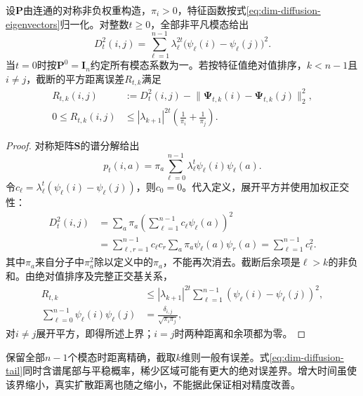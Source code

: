 \begin{theorem}[扩散距离的谱表示与截断界]
  \label{thm:dim-diffusion-isometry}
  设$\bm{P}$由连通的对称非负权重构造，$\pi_i>0$，特征函数按式\eqref{eq:dim-diffusion-eigenvectors}归一化。对整数$t\geq0$，全部非平凡模态给出
  \begin{equation}
    \label{eq:dim-diffusion-identity}
    D_t^2(i,j)
    =\sum_{\ell=1}^{n-1}\lambda_\ell^{2t}
      \bigl(\psi_\ell(i)-\psi_\ell(j)\bigr)^2.
  \end{equation}
  当$t=0$时按$\bm{P}^0=\bm{I}_n$约定所有模态系数为一。若按特征值绝对值排序，$k<n-1$且$i\ne j$，截断的平方距离误差$R_{t,k}$满足
  \begin{equation}
    \label{eq:dim-diffusion-tail}
    \begin{aligned}
      R_{t,k}(i,j)
        &:=D_t^2(i,j)
          -\lVert\bm{\Psi}_{t,k}(i)-\bm{\Psi}_{t,k}(j)\rVert_2^2,\\
      0\leq R_{t,k}(i,j)
        &\leq|\lambda_{k+1}|^{2t}
          \left(\frac1{\pi_i}+\frac1{\pi_j}\right).
    \end{aligned}
  \end{equation}
\end{theorem}
\begin{proof}
  对称矩阵$\bm{S}$的谱分解给出
  \[
    p_t(i,a)=\pi_a\sum_{\ell=0}^{n-1}
      \lambda_\ell^t\psi_\ell(i)\psi_\ell(a).
  \]
  令$c_\ell=\lambda_\ell^t(\psi_\ell(i)-\psi_\ell(j))$，则$c_0=0$。代入定义，展开平方并使用加权正交性：
  \[
    \begin{aligned}
      D_t^2(i,j)
        &=\sum_a\pi_a
          \left(\sum_{\ell=1}^{n-1}c_\ell\psi_\ell(a)\right)^2\\
        &=\sum_{\ell,r=1}^{n-1}c_\ell c_r
          \sum_a\pi_a\psi_\ell(a)\psi_r(a)
         =\sum_{\ell=1}^{n-1}c_\ell^2.
    \end{aligned}
  \]
  其中$\pi_a$来自分子中$\pi_a^2$除以定义中的$\pi_a$，不能再次消去。截断后余项是$\ell>k$的非负和。由绝对值排序及完整正交基关系，
  \[
    \begin{aligned}
      R_{t,k}
        &\leq|\lambda_{k+1}|^{2t}
          \sum_{\ell=1}^{n-1}
            (\psi_\ell(i)-\psi_\ell(j))^2,\\
      \sum_{\ell=0}^{n-1}\psi_\ell(i)\psi_\ell(j)
        &=\frac{\delta_{i,j}}{\sqrt{\pi_i\pi_j}},
    \end{aligned}
  \]
  对$i\ne j$展开平方，即得所述上界；$i=j$时两种距离和余项都为零。
\end{proof}

保留全部$n-1$个模态时距离精确，截取$k$维则一般有误差。式\eqref{eq:dim-diffusion-tail}同时含谱尾部与平稳概率，稀少区域可能有更大的绝对误差界。增大时间虽使该界缩小，真实扩散距离也随之缩小，不能据此保证相对精度改善。

